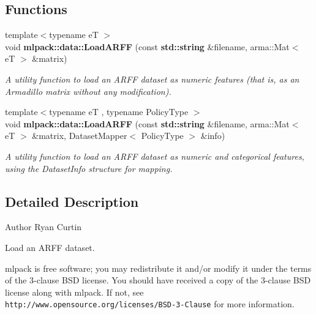 \subsection*{Functions}
\begin{DoxyCompactItemize}
\item 
{\footnotesize template$<$typename eT $>$ }\\void {\bf mlpack\+::data\+::\+Load\+A\+R\+FF} (const {\bf std\+::string} \&filename, arma\+::\+Mat$<$ eT $>$ \&matrix)
\begin{DoxyCompactList}\small\item\em A utility function to load an A\+R\+FF dataset as numeric features (that is, as an Armadillo matrix without any modification). \end{DoxyCompactList}\item 
{\footnotesize template$<$typename eT , typename Policy\+Type $>$ }\\void {\bf mlpack\+::data\+::\+Load\+A\+R\+FF} (const {\bf std\+::string} \&filename, arma\+::\+Mat$<$ eT $>$ \&matrix, Dataset\+Mapper$<$ Policy\+Type $>$ \&info)
\begin{DoxyCompactList}\small\item\em A utility function to load an A\+R\+FF dataset as numeric and categorical features, using the Dataset\+Info structure for mapping. \end{DoxyCompactList}\end{DoxyCompactItemize}


\subsection{Detailed Description}
\begin{DoxyAuthor}{Author}
Ryan Curtin
\end{DoxyAuthor}
Load an A\+R\+FF dataset.

mlpack is free software; you may redistribute it and/or modify it under the terms of the 3-\/clause B\+SD license. You should have received a copy of the 3-\/clause B\+SD license along with mlpack. If not, see {\tt http\+://www.\+opensource.\+org/licenses/\+B\+S\+D-\/3-\/\+Clause} for more information. 